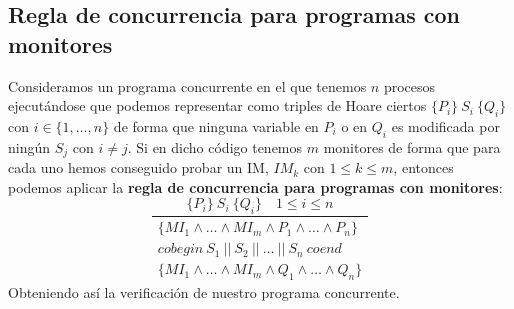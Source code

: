 \begin{ejercicio*}
\end{ejercicio*}

\subsection{Regla de concurrencia para programas con monitores}
Consideramos un programa concurrente en el que tenemos $n$ procesos ejecutándose que podemos representar como triples de Hoare ciertos $\{P_i\}\ S_i\ \{Q_i\}$ con \newline $i \in \{1, \ldots, n\}$ de forma que ninguna variable en $P_i$ o en $Q_i$ es modificada por ningún $S_j$ con $i\neq j$. Si en dicho código tenemos $m$ monitores de forma que para cada uno hemos conseguido probar un IM, $IM_k$ con $1 \leq k \leq m$, entonces podemos aplicar la \textbf{regla de concurrencia para programas con monitores}:
\begin{equation*}
    \dfrac{\{P_i\}\ S_i\ \{Q_i\} \quad 1 \leq i \leq n}{\begin{array}{c}
            \{MI_1 \land \ldots \land MI_m \land P_1 \land \ldots\land P_n\} \\
            cobegin\ S_1\ ||\ S_2\ ||\ \ldots\ ||\ S_n\ coend \\
            \{MI_1 \land \ldots \land MI_m \land Q_1 \land  \ldots\land Q_n\} 
        \end{array}}
\end{equation*}
Obteniendo así la verificación de nuestro programa concurrente.

